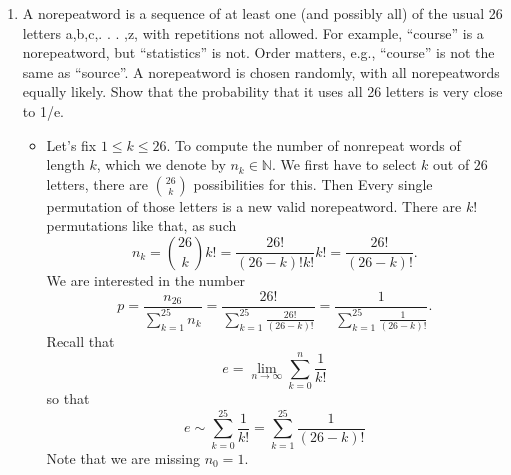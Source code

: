 \documentclass{article}
\begin{document}
\begin{enumerate}
\begin{enumerate}
		\end{enumerate}
	\item A norepeatword is a sequence of at least one (and possibly all) of the usual 26 letters a,b,c,. . . ,z, with repetitions not allowed. For example, “course” is a norepeatword, but “statistics” is not. Order matters, e.g., “course” is not the same as “source”. A norepeatword is chosen randomly, with all norepeatwords equally likely. Show that the probability that it uses all 26 letters is very close to 1/e.
		\begin{itemize}
			\item Let's fix $1 \leq k \leq 26$. To compute the number of nonrepeat words of length $k$, which we denote by $n_k \in \mathbb{N}$. We first have to select $k$ out of $26$ letters, there are $\binom{26}{k}$ possibilities for this. Then Every single permutation of those letters is a new valid norepeatword. There are $k!$ permutations like that, as such
			$$
			n_k = \binom{26}{k} k! = \frac{26!}{(26 - k)!k!} k! = \frac{26!}{(26 - k)!}.
			$$
			We are interested in the number
			$$
			p = \frac{n_{26}}{\sum_{k = 1}^{25} n_k} = \frac{26!}{\sum_{k = 1}^{25} \frac{26!}{(26 - k)!}} = \frac{1}{\sum_{k = 1}^{25} \frac{1}{(26 - k)!}}.
			$$
			Recall that
			$$
			e = \lim_{n \rightarrow \infty} \sum_{k = 0}^n \frac{1}{k!}
			$$
			so that
			$$
			e \sim \sum_{k = 0}^{25} \frac{1}{k!} = \sum_{k = 1}^{25} \frac{1}{(26 - k)!}
			$$
			Note that we are missing $n_0 = 1$.
		\end{itemize}
\end{enumerate}
\end{document}
